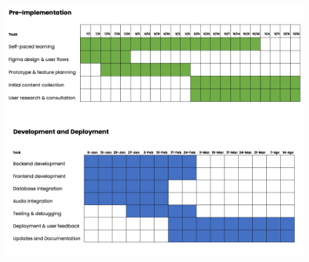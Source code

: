     \begin{figure}[ht]
    \begin{center}
        \includegraphics[width=480px]{Texfiles/images/preimp.png}
    \end{center}
        \includegraphics[width=480px]{Texfiles/images/devt.png}
    \end{figure}